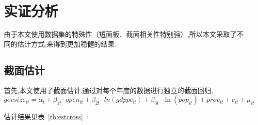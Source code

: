 \documentclass[10pt]{article}
\begin{document}
\section{实证分析}
    由于本文使用数据集的特殊性（短面板、截面相关性特别强）,所以本文采取了不同的估计方式,来得到更加稳健的结果.
\subsection{截面估计}
    首先,本文使用了截面估计.通过对每个年度的数据进行独立的截面回归,
    \begin{equation}
        govsize_{it} = \alpha_t + \beta_{1t} \cdot open_{it} + \beta_{2t} \cdot ln(gdppc_{it}) + \beta_{3t} \cdot \ln(pop_{it}) + prov_{it} +c_{it} + \mu_{it}
    \end{equation}


    估计结果见表~\ref{tb:estcross}~:
\end{document}

